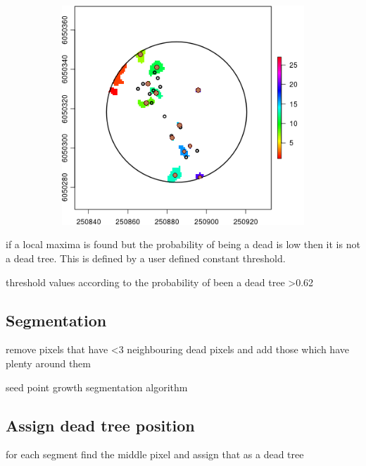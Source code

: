 \documentclass{subfiles}
\begin{document}
\begin{figure} [h!]
\begin{subfigure}[t]{.49\textwidth}
  	\end{subfigure}
  	\begin{subfigure}[t]{.49\textwidth}
  		\centering
  		\includegraphics[width=\textwidth]{img/dead/c11_TreePos}
  		\caption{} 
  		\label{fig:c11_results}
  	\end{subfigure}
  	\caption{ }  
  	\label{fig:dt_sf_segm_results} 
  \end{figure}
  
 \par if a local maxima is found but the probability of being a dead is low then it is not a dead tree. This is defined by a user defined constant threshold. 
 
  \par threshold values according to the probability of been a dead tree >0.62
 
 \subsection{Segmentation}
  \par remove pixels that have <3 neighbouring dead pixels and add those which have plenty around them
  \par seed point growth segmentation algorithm
  
  \subsection{Assign dead tree position}
  \par for each segment find the middle pixel and assign that as a dead tree
\end{document}
